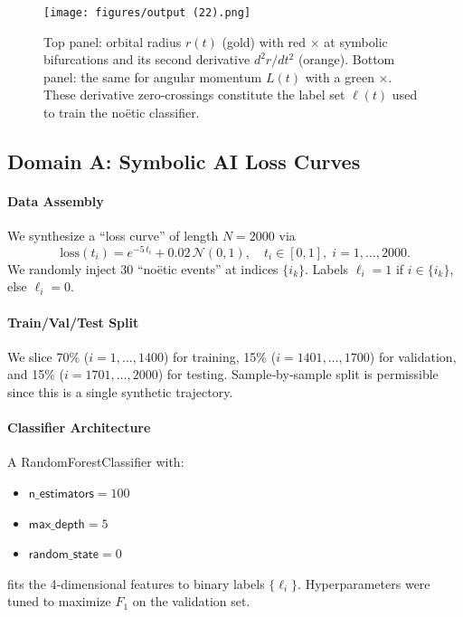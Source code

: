 \documentclass[11pt]{article}
\begin{document}
\begin{figure}[H]
  \centering
  \texttt{[image: figures/output (22).png]}
  \caption{Top panel: orbital radius \(r(t)\) (gold) with red \(\times\) at symbolic bifurcations and its second derivative \(d^2r/dt^2\) (orange). Bottom panel: the same for angular momentum \(L(t)\) with a green \(\times\). These derivative zero-crossings constitute the label set \(\ell(t)\) used to train the noëtic classifier.}
  \label{fig:radius_momentum_bifurcation}
\end{figure}

\subsection{Domain A: Symbolic AI Loss Curves}
\paragraph{Data Assembly}
We synthesize a “loss curve” of length \(N=2000\) via
\[
  \mathrm{loss}(t_i) = e^{-5\,t_i} + 0.02\,\mathcal{N}(0,1),
  \quad t_i \in [0,1],\; i = 1,\ldots,2000.
\]
We randomly inject 30 “noëtic events” at indices \(\{i_k\}\). Labels \(\ell_i = 1\) if \(i \in \{i_k\}\), else \(\ell_i = 0\).

\paragraph{Train/Val/Test Split}
We slice 70\% (\(i=1,\ldots,1400\)) for training, 15\% (\(i=1401,\ldots,1700\)) for validation, and 15\% (\(i=1701,\ldots,2000\)) for testing. Sample‐by‐sample split is permissible since this is a single synthetic trajectory.

\paragraph{Classifier Architecture}
A RandomForestClassifier with:
\begin{itemize}[itemsep=1pt]
  \item \(\mathsf{n\_estimators} = 100\)
  \item \(\mathsf{max\_depth} = 5\)
  \item \(\mathsf{random\_state} = 0\)
\end{itemize}
fits the 4‐dimensional features to binary labels \(\{\ell_i\}\). Hyperparameters were tuned to maximize \(F_{1}\) on the validation set.
\end{document}
